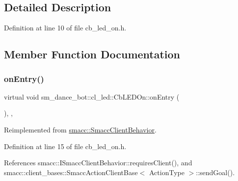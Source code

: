 \subsection{Detailed Description}


Definition at line 10 of file cb\+\_\+led\+\_\+on.\+h.



\subsection{Member Function Documentation}
\mbox{\label{classsm__dance__bot_1_1cl__led_1_1CbLEDOn_a3b7de8585d728becefb8c2c5cc3b6d95}} 
\subsubsection{\texorpdfstring{on\+Entry()}{onEntry()}}
{\footnotesize\ttfamily virtual void sm\+\_\+dance\+\_\+bot\+::cl\+\_\+led\+::\+Cb\+L\+E\+D\+On\+::on\+Entry (\begin{DoxyParamCaption}{ }\end{DoxyParamCaption})\hspace{0.3cm}{\ttfamily [inline]}, {\ttfamily [override]}, {\ttfamily [virtual]}}



Reimplemented from \hyperlink{classsmacc_1_1SmaccClientBehavior_ad5d3e1f1697c3cfe66c94cadba948493}{smacc\+::\+Smacc\+Client\+Behavior}.



Definition at line 15 of file cb\+\_\+led\+\_\+on.\+h.



References smacc\+::\+I\+Smacc\+Client\+Behavior\+::requires\+Client(), and smacc\+::client\+\_\+bases\+::\+Smacc\+Action\+Client\+Base$<$ Action\+Type $>$\+::send\+Goal().


